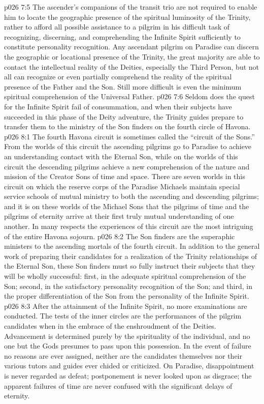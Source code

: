 \vs p026 7:5 \pc The ascender’s companions of the transit trio are not required to enable him to locate the geographic presence of the spiritual luminosity of the Trinity, rather to afford all possible assistance to a pilgrim in his difficult task of recognizing, discerning, and comprehending the Infinite Spirit sufficiently to constitute personality recognition. Any ascendant pilgrim on Paradise can discern the geographic or locational presence of the Trinity, the great majority are able to contact the intellectual reality of the Deities, especially the Third Person, but not all can recognize or even partially comprehend the reality of the spiritual presence of the Father and the Son. Still more difficult is even the minimum spiritual comprehension of the Universal Father.
\vs p026 7:6 Seldom does the quest for the Infinite Spirit fail of consummation, and when their subjects have succeeded in this phase of the Deity adventure, the Trinity guides prepare to transfer them to the ministry of the Son finders on the fourth circle of Havona.
\vs p026 8:1 The fourth Havona circuit is sometimes called the “circuit of the Sons.” From the worlds of this circuit the ascending pilgrims go to Paradise to achieve an understanding contact with the Eternal Son, while on the worlds of this circuit the descending pilgrims achieve a new comprehension of the nature and mission of the Creator Sons of time and space. There are seven worlds in this circuit on which the reserve corps of the Paradise Michaels maintain special service schools of mutual ministry to both the ascending and descending pilgrims; and it is on these worlds of the Michael Sons that the pilgrims of time and the pilgrims of eternity arrive at their first truly mutual understanding of one another. In many respects the experiences of this circuit are the most intriguing of the entire Havona sojourn.
\vs p026 8:2 The Son finders are the superaphic ministers to the ascending mortals of the fourth circuit. In addition to the general work of preparing their candidates for a realization of the Trinity relationships of the Eternal Son, these Son finders must so fully instruct their subjects that they will be wholly successful: first, in the adequate spiritual comprehension of the Son; second, in the satisfactory personality recognition of the Son; and third, in the proper differentiation of the Son from the personality of the Infinite Spirit.
\vs p026 8:3 After the attainment of the Infinite Spirit, no more examinations are conducted. The tests of the inner circles are the performances of the pilgrim candidates when in the embrace of the enshroudment of the Deities. Advancement is determined purely by the spirituality of the individual, and no one but the Gods presumes to pass upon this possession. In the event of failure no reasons are ever assigned, neither are the candidates themselves nor their various tutors and guides ever chided or criticized. On Paradise, disappointment is never regarded as defeat; postponement is never looked upon as disgrace; the apparent failures of time are never confused with the significant delays of eternity.
